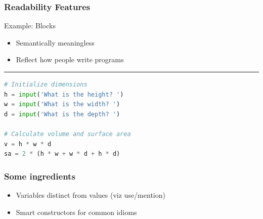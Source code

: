 \documentclass{beamer}
\begin{document}

\begin{frame}[fragile]

\frametitle{Readability Features}

Example: Blocks
\begin{itemize}
  \item Semantically meaningless
  \item Reflect how people write programs
\end{itemize}

\noindent\rule{\textwidth}{1pt}

\begin{lstlisting}[language=Python,basicstyle=\footnotesize]
# Initialize dimensions
h = input('What is the height? ')
w = input('What is the width? ')
d = input('What is the depth? ')

# Calculate volume and surface area
v = h * w * d
sa = 2 * (h * w + w * d + h * d)
\end{lstlisting}
\end{frame}


\begin{frame}

\frametitle{Some ingredients}

\begin{itemize}
  \item Variables distinct from values (viz use/mention)
  \item Smart constructors for common idioms
\end{itemize}

\end{frame}

\end{document}
